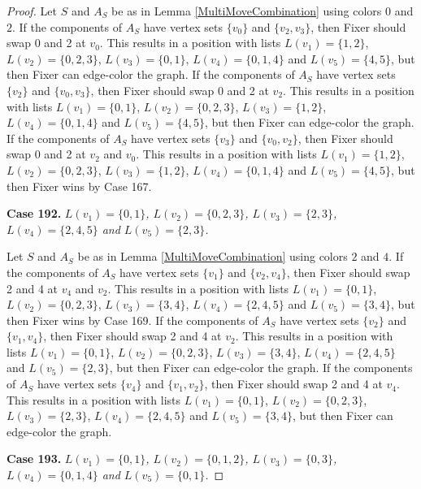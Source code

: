 \documentclass[12pt]{amsart}
\theoremstyle{plain}
\theoremstyle{definition}
\theoremstyle{remark}
\begin{document}
\begin{proof}
Let $S$ and $A_S$ be as in Lemma \ref{MultiMoveCombination} using colors $0$ and $2$. If the components of $A_S$ have vertex sets $\{v_0\}$ and $\{v_2, v_3\}$, then Fixer should swap 0 and 2 at $v_0$. This results in a position with lists $L(v_1) = \{1, 2\}$, $L(v_2) = \{0, 2, 3\}$, $L(v_3) = \{0, 1\}$, $L(v_4) = \{0, 1, 4\}$ and $L(v_5) = \{4, 5\}$, but then Fixer can edge-color the graph.
If the components of $A_S$ have vertex sets $\{v_2\}$ and $\{v_0, v_3\}$, then Fixer should swap 0 and 2 at $v_2$. This results in a position with lists $L(v_1) = \{0, 1\}$, $L(v_2) = \{0, 2, 3\}$, $L(v_3) = \{1, 2\}$, $L(v_4) = \{0, 1, 4\}$ and $L(v_5) = \{4, 5\}$, but then Fixer can edge-color the graph.
If the components of $A_S$ have vertex sets $\{v_3\}$ and $\{v_0, v_2\}$, then Fixer should swap 0 and 2 at $v_2$ and $v_0$. This results in a position with lists $L(v_1) = \{1, 2\}$, $L(v_2) = \{0, 2, 3\}$, $L(v_3) = \{1, 2\}$, $L(v_4) = \{0, 1, 4\}$ and $L(v_5) = \{4, 5\}$, but then Fixer wins by Case 167.

\noindent\textbf{Case 192.  }\textit{$L(v_1) = \{0, 1\}$, $L(v_2) = \{0, 2, 3\}$, $L(v_3) = \{2, 3\}$, $L(v_4) = \{2, 4, 5\}$ and $L(v_5) = \{2, 3\}$.}

Let $S$ and $A_S$ be as in Lemma \ref{MultiMoveCombination} using colors $2$ and $4$. If the components of $A_S$ have vertex sets $\{v_1\}$ and $\{v_2, v_4\}$, then Fixer should swap 2 and 4 at $v_4$ and $v_2$. This results in a position with lists $L(v_1) = \{0, 1\}$, $L(v_2) = \{0, 2, 3\}$, $L(v_3) = \{3, 4\}$, $L(v_4) = \{2, 4, 5\}$ and $L(v_5) = \{3, 4\}$, but then Fixer wins by Case 169.
If the components of $A_S$ have vertex sets $\{v_2\}$ and $\{v_1, v_4\}$, then Fixer should swap 2 and 4 at $v_2$. This results in a position with lists $L(v_1) = \{0, 1\}$, $L(v_2) = \{0, 2, 3\}$, $L(v_3) = \{3, 4\}$, $L(v_4) = \{2, 4, 5\}$ and $L(v_5) = \{2, 3\}$, but then Fixer can edge-color the graph.
If the components of $A_S$ have vertex sets $\{v_4\}$ and $\{v_1, v_2\}$, then Fixer should swap 2 and 4 at $v_4$. This results in a position with lists $L(v_1) = \{0, 1\}$, $L(v_2) = \{0, 2, 3\}$, $L(v_3) = \{2, 3\}$, $L(v_4) = \{2, 4, 5\}$ and $L(v_5) = \{3, 4\}$, but then Fixer can edge-color the graph.

\noindent\textbf{Case 193.  }\textit{$L(v_1) = \{0, 1\}$, $L(v_2) = \{0, 1, 2\}$, $L(v_3) = \{0, 3\}$, $L(v_4) = \{0, 1, 4\}$ and $L(v_5) = \{0, 1\}$.}


\end{proof}
\end{document}
